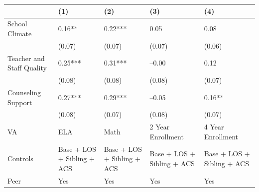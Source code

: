 \begin{table}[tbp] \centering
{}

{\footnotesize
\begin{tabularx}{\linewidth}{lCCCC}

\toprule
&{(1)}&{(2)}&{(3)}&{(4)} \tabularnewline
\midrule \addlinespace[\belowrulesep]
School Climate&0.16**&0.22***&0.05&0.08 \tabularnewline
&(0.07)&(0.07)&(0.07)&(0.06) \tabularnewline
Teacher and Staff Quality&0.25***&0.31***&--0.00&0.12 \tabularnewline
&(0.08)&(0.08)&(0.08)&(0.07) \tabularnewline
Counseling Support&0.27***&0.29***&--0.05&0.16** \tabularnewline
&(0.08)&(0.07)&(0.08)&(0.07) \tabularnewline
\midrule VA&ELA&Math&2 Year Enrollment&4 Year Enrollment \tabularnewline
Controls&Base + LOS + Sibling + ACS&Base + LOS + Sibling + ACS&Base + LOS + Sibling + ACS&Base + LOS + Sibling + ACS \tabularnewline
Peer&Yes&Yes&Yes&Yes \tabularnewline
\bottomrule 

\end{tabularx}
}
\end{table}
